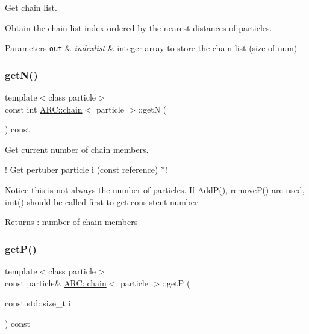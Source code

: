 Get chain list. 

Obtain the chain list index ordered by the nearest distances of particles. 
\begin{DoxyParams}[1]{Parameters}
\mbox{\tt out}  & {\em indexlist} & integer array to store the chain list (size of num) \\
\hline
\end{DoxyParams}
\hypertarget{classARC_1_1chain_a43414423b01a8ee5e88f5c3cf28fd2c6}{}\label{classARC_1_1chain_a43414423b01a8ee5e88f5c3cf28fd2c6} 
\subsubsection{\texorpdfstring{get\+N()}{getN()}}
{\footnotesize\ttfamily template$<$class particle$>$ \\
const int \hyperlink{classARC_1_1chain}{A\+R\+C\+::chain}$<$ particle $>$\+::getN (\begin{DoxyParamCaption}{ }\end{DoxyParamCaption}) const\hspace{0.3cm}{\ttfamily [inline]}}



Get current number of chain members. 

! Get pertuber particle i (const reference) $\ast$!

Notice this is not always the number of particles. If Add\+P(), \hyperlink{classARC_1_1chain_a6c622f6f09a11f81a72e26de0c8cbfc8}{remove\+P()} are used, \hyperlink{classARC_1_1chain_a269690a2daece1dacb21a78e11b019a6}{init()} should be called first to get consistent number. \begin{DoxyReturn}{Returns}
\+: number of chain members 
\end{DoxyReturn}
\hypertarget{classARC_1_1chain_a94fb8a78d6b34b4cb7376f92dfcd6f99}{}\label{classARC_1_1chain_a94fb8a78d6b34b4cb7376f92dfcd6f99} 
\subsubsection{\texorpdfstring{get\+P()}{getP()}}
{\footnotesize\ttfamily template$<$class particle$>$ \\
const particle\& \hyperlink{classARC_1_1chain}{A\+R\+C\+::chain}$<$ particle $>$\+::getP (\begin{DoxyParamCaption}\item[{const std\+::size\+\_\+t}]{i }\end{DoxyParamCaption}) const\hspace{0.3cm}{\ttfamily [inline]}}



